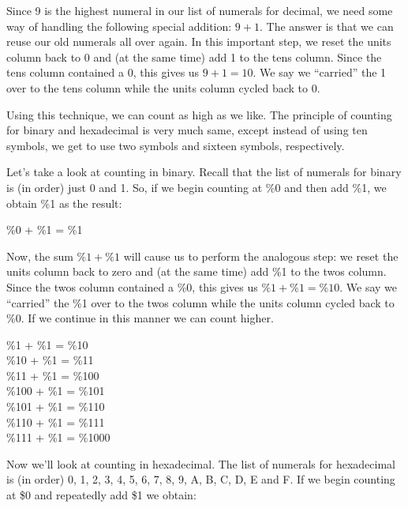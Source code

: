 Since 9 is the highest numeral in our list of numerals for decimal, we need some way of handling the following special addition: $9 + 1$. The answer is that we can reuse our old numerals all over again. In this important step, we reset the units column back to 0 and (at the same time) add 1 to the tens column. Since the tens column contained a 0, this gives us $9 + 1 = 10$. We say we ``carried'' the 1 over to the tens column while the units column cycled back to 0.

Using this technique, we can count as high as we like. The principle of counting for binary and hexadecimal is very much same, except instead of using ten symbols, we get to use two symbols and sixteen symbols, respectively.

Let's take a look at counting in binary. Recall that the list of numerals for binary is (in order) just 0 and 1. So, if we begin counting at \%0 and then add \%1, we obtain \%1 as the result:

\begin{center}
	\%0 + \%1 = \%1 \\
\end{center}

Now, the sum $\%1 + \%1$ will cause us to perform the analogous step: we reset the units column back to zero and (at the same time) add \%1 to the twos column. Since the twos column contained a \%0, this gives us $\%1 + \%1 = \%10$. We say we ``carried'' the \%1 over to the twos column while the units column cycled back to \%0. If we continue in this manner we can count higher.

\begin{center}
  \%1 + \%1 = \%10 \\
  \%10 + \%1 = \%11 \\
  \%11 + \%1 = \%100 \\
  \%100 + \%1 = \%101 \\
  \%101 + \%1 = \%110 \\
  \%110 + \%1 = \%111 \\
  \%111 + \%1 = \%1000 \\
\end{center}

Now we'll look at counting in hexadecimal. The list of numerals for hexadecimal is (in order) 0, 1, 2, 3, 4, 5, 6, 7, 8, 9, A, B, C, D, E and F. If we begin counting at \$0 and repeatedly add \$1 we obtain:

